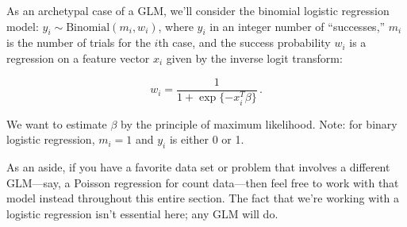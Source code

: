 \documentclass{article}
\begin{document}
As an archetypal case of a GLM, we'll consider the binomial logistic regression model: $y_i \sim \mbox{Binomial}(m_i, w_i)$, where $y_i$ in an integer number of ``successes,'' $m_i$ is the number of trials for the $i$th case, and the success probability $w_i$ is a regression on a feature vector $x_i$ given by the inverse logit transform:



$$

w_i = \frac{1}{1 + \exp\{-x_i^T \beta\}} \, .

$$



We want to estimate $\beta$ by the principle of maximum likelihood.  Note: for binary logistic regression, $m_i = 1$ and $y_i$ is either 0 or 1.







As an aside, if you have a favorite data set or problem that involves a different GLM---say, a Poisson regression for count data---then feel free to work with that model instead throughout this entire section.  The fact that we're working with a logistic regression isn't essential here; any GLM will do.
\end{document}
